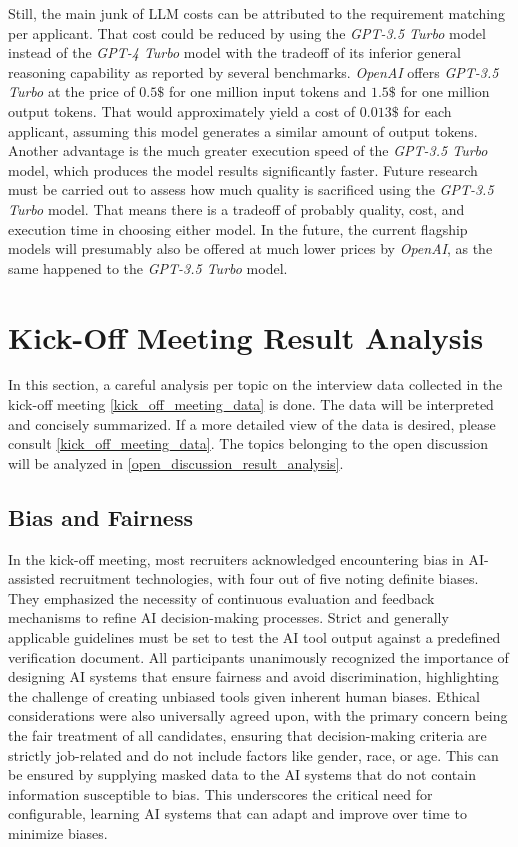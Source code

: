 \documentclass[draft,final]{thesisclass} %
\begin{document}
Still, the main junk of \gls{LLM} costs can be attributed to the requirement matching per applicant. That cost could be reduced by using the \textit{GPT-3.5 Turbo} model instead of the \textit{GPT-4 Turbo} model with the tradeoff of its inferior general reasoning capability as reported by several benchmarks. \textit{OpenAI} offers \textit{GPT-3.5 Turbo} at the price of $0.5\$$ for one million input tokens and $1.5\$$ for one million output tokens. That would approximately yield a cost of $0.013\$$ for each applicant, assuming this model generates a similar amount of output tokens. Another advantage is the much greater execution speed of the \textit{GPT-3.5 Turbo} model, which produces the model results significantly faster. Future research must be carried out to assess how much quality is sacrificed using the \textit{GPT-3.5 Turbo} model. That means there is a tradeoff of probably quality, cost, and execution time in choosing either model.
In the future, the current flagship models will presumably also be offered at much lower prices by \textit{OpenAI}, as the same happened to the \textit{GPT-3.5 Turbo} model.

\section{Kick-Off Meeting Result Analysis}
In this section, a careful analysis per topic on the interview data collected in the kick-off meeting \ref{kick_off_meeting_data} is done. The data will be interpreted and concisely summarized. If a more detailed view of the data is desired, please consult \ref{kick_off_meeting_data}. The topics belonging to the open discussion will be analyzed in \ref{open_discussion_result_analysis}.

\subsection{Bias and Fairness}
In the kick-off meeting, most recruiters acknowledged encountering bias in \acs{AI}-assisted recruitment technologies, with four out of five noting definite biases. They emphasized the necessity of continuous evaluation and feedback mechanisms to refine \acs{AI} decision-making processes. Strict and generally applicable guidelines must be set to test the \acs{AI} tool output against a predefined verification document. All participants unanimously recognized the importance of designing \acs{AI} systems that ensure fairness and avoid discrimination, highlighting the challenge of creating unbiased tools given inherent human biases. Ethical considerations were also universally agreed upon, with the primary concern being the fair treatment of all candidates, ensuring that decision-making criteria are strictly job-related and do not include factors like gender, race, or age. This can be ensured by supplying masked data to the \acs{AI} systems that do not contain information susceptible to bias. This underscores the critical need for configurable, learning \acs{AI} systems that can adapt and improve over time to minimize biases.
\end{document}
